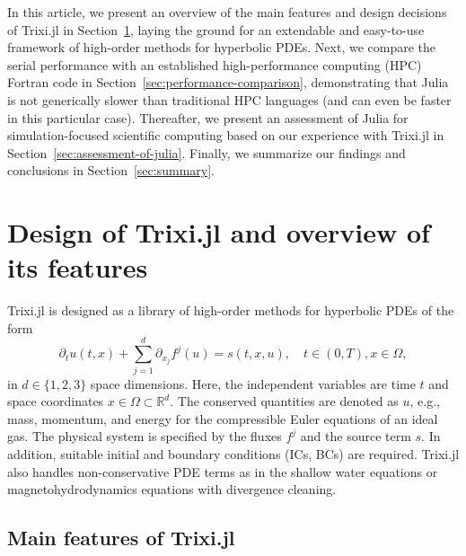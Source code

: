 \documentclass[hidelinks]{juliacon} %
\makeatletter
\newcommand{\eg}[0]{{e.g.\@}\xspace}
\newcommand{\trixi}{Trixi.jl\xspace}
\makeatother
\begin{document}
In this article, we present an overview of the main features and design decisions
of \trixi in Section~\ref{sec:design-of-trixi}, laying the ground for an extendable
and easy-to-use framework of high-order methods for hyperbolic PDEs. Next, we
compare the serial performance with an established high-performance computing (HPC) Fortran code in
Section~\ref{sec:performance-comparison}, demonstrating that Julia is not generically
slower than traditional HPC languages (and can even be faster in this particular case).
Thereafter, we present an assessment of Julia for simulation-focused scientific
computing based on our experience with \trixi in Section~\ref{sec:assessment-of-julia}.
Finally, we summarize our findings and conclusions in Section~\ref{sec:summary}.



\section{Design of \trixi and overview of its features}
\label{sec:design-of-trixi}

\trixi is designed as a library of high-order methods for hyperbolic PDEs of
the form
\begin{equation}
\label{eq:hcl}
  \partial_t u(t, x) + \sum_{j=1}^d \partial_{x_j} f^j(u) = s(t, x, u),
  \quad t \in (0, T), x \in \Omega,
\end{equation}
in $d \in \{1, 2, 3\}$ space dimensions. Here, the independent variables are
time $t$ and space coordinates $x \in \Omega \subset \mathbb{R}^d$. The conserved
quantities are denoted as $u$, \eg, mass, momentum, and energy for the compressible
Euler equations of an ideal gas.
The physical system is specified by the fluxes $f^j$ and the source term $s$.
In addition, suitable initial and boundary conditions (ICs, BCs) are required.
\trixi also handles non-conservative PDE terms as in the shallow water equations or magnetohydrodynamics equations
with divergence cleaning.


\subsection{Main features of \trixi}
\end{document}
